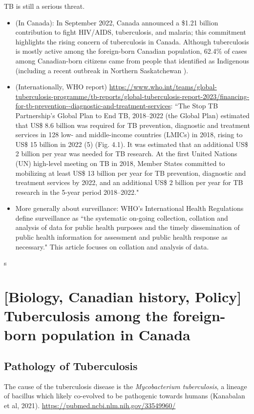 \documentclass[sn-mathphys,Numbered]{sn-jnl}%
\theoremstyle{thmstyleone}%
\theoremstyle{thmstyletwo}%
\theoremstyle{thmstylethree}%
\begin{document}
TB is still a serious threat.  
\begin{itemize}
    \item (In Canada): In September 2022, Canada announced a \$1.21 billion contribution to fight HIV/AIDS, tuberculosis, and malaria\cite{CanadaGlobalAffairs}; this commitment highlights the rising concern of tuberculosis in Canada.  Although tuberculosis is mostly active among the foreign-born Canadian population, 62.4\% of cases among Canadian-born citizens came from people that identified as Indigenous \cite{CanadaTB} (including a recent outbreak in Northern Saskatchewan \cite{Ndubuka2021Descriptive2019}). 
    
    \item (Internationally, WHO report) \url{https://www.who.int/teams/global-tuberculosis-programme/tb-reports/global-tuberculosis-report-2023/financing-for-tb-prevention--diagnostic-and-treatment-services}: ``The Stop TB Partnership’s Global Plan to End TB, 2018–2022 (the Global Plan) estimated that US\$ 8.6 billion was required for TB prevention, diagnostic and treatment services in 128 low- and middle-income countries (LMICs) in 2018, rising to US\$ 15 billion in 2022 (5) (Fig. 4.1). It was estimated that an additional US\$ 2 billion per year was needed for TB research. At the first United Nations (UN) high-level meeting on TB in 2018, Member States committed to mobilizing at least US\$ 13 billion per year for TB prevention, diagnostic and treatment services by 2022, and an additional US\$ 2 billion per year for TB research in the 5-year period 2018–2022." 
    
    \item More generally about surveillance: WHO's International Health Regulations \cite{WHO_Organization_2008} define surveillance as ``the systematic on-going collection, collation and analysis of data for public health purposes and the timely dissemination of public health information for assessment and public health response as necessary."  This article focuses on collation and analysis of data.
\end{itemize}


s
\section{[Biology, Canadian history, Policy] Tuberculosis among the foreign-born population in Canada}

\subsection{Pathology of Tuberculosis}
    The cause of the tuberculosis disease is the \textit{Mycobacterium tuberculosis}, a lineage of bacillus which likely co-evolved to be pathogenic towards humans (Kanabalan et al, 2021). 
\url{https://pubmed.ncbi.nlm.nih.gov/33549960/}
    
\end{document}
